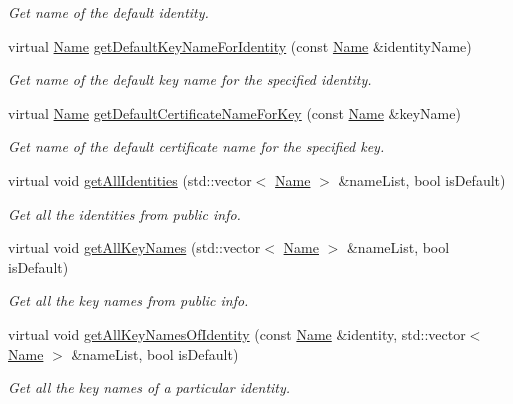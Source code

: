 \begin{DoxyCompactItemize}
\begin{DoxyCompactList}\small\item\em Get name of the default identity. \end{DoxyCompactList}\item 
virtual \hyperlink{classndn_1_1Name}{Name} \hyperlink{classndn_1_1security_1_1DummyPublicInfo_ac53edecb14675bda7ac6e38de83bf28e}{get\+Default\+Key\+Name\+For\+Identity} (const \hyperlink{classndn_1_1Name}{Name} \&identity\+Name)
\begin{DoxyCompactList}\small\item\em Get name of the default key name for the specified identity. \end{DoxyCompactList}\item 
virtual \hyperlink{classndn_1_1Name}{Name} \hyperlink{classndn_1_1security_1_1DummyPublicInfo_a9a10215826f3679442dabe0987723ff9}{get\+Default\+Certificate\+Name\+For\+Key} (const \hyperlink{classndn_1_1Name}{Name} \&key\+Name)
\begin{DoxyCompactList}\small\item\em Get name of the default certificate name for the specified key. \end{DoxyCompactList}\item 
virtual void \hyperlink{classndn_1_1security_1_1DummyPublicInfo_a10f354425de3853d653bad158abd3890}{get\+All\+Identities} (std\+::vector$<$ \hyperlink{classndn_1_1Name}{Name} $>$ \&name\+List, bool is\+Default)
\begin{DoxyCompactList}\small\item\em Get all the identities from public info. \end{DoxyCompactList}\item 
virtual void \hyperlink{classndn_1_1security_1_1DummyPublicInfo_a90ebae9b6a35a90d454723e460e0f21c}{get\+All\+Key\+Names} (std\+::vector$<$ \hyperlink{classndn_1_1Name}{Name} $>$ \&name\+List, bool is\+Default)
\begin{DoxyCompactList}\small\item\em Get all the key names from public info. \end{DoxyCompactList}\item 
virtual void \hyperlink{classndn_1_1security_1_1DummyPublicInfo_ad2afd9ca43a948691f617c963483031d}{get\+All\+Key\+Names\+Of\+Identity} (const \hyperlink{classndn_1_1Name}{Name} \&identity, std\+::vector$<$ \hyperlink{classndn_1_1Name}{Name} $>$ \&name\+List, bool is\+Default)
\begin{DoxyCompactList}\small\item\em Get all the key names of a particular identity. \end{DoxyCompactList}\item 

\end{DoxyCompactItemize}
